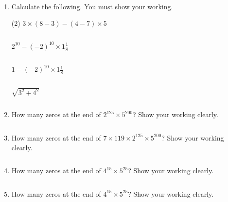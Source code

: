 \begin{enumerate} [leftmargin=0cm]
\item Calculate the following. You must show your working.
\begin{tasks}[label=(\alph*), after-item-skip=2pt,after-skip=3pt, label-width=4ex](2)
    \task  $ 3 \times (8-3) - (4-7) \times 5               $                  \\  \begin{envAnswer}[blankline=5]        $       $ \end{envAnswer}
    \task  $ 2^{10}-(-2)^{10} \times 1 \frac{1}{8}               $                  \\  \begin{envAnswer}[blankline=5]        $       $ \end{envAnswer}
    \task  $ 1-(-2)^{10} \times 1 \frac{1}{8}                  $                  \\  \begin{envAnswer}[blankline=5]        $       $ \end{envAnswer}
    \task  $ \sqrt{3^2 + 4^2}                              $                  \\  \begin{envAnswer}[blankline=5]        $       $ \end{envAnswer}
\end{tasks}


\item   How many zeros at the end of $2^{125} \times 5^{200}$? Show your working clearly.       \begin{envAnswer}[blankline= 2 ] $  $ \end{envAnswer}

\item   How many zeros at the end of $7\times 119 \times 2^{125} \times 5^{200}$? Show your working clearly.        \begin{envAnswer}[blankline= 2 ] $  $ \end{envAnswer}

\item   How many zeros at the end of $4^{15} \times 5^{25}$? Show your working clearly.       \begin{envAnswer}[blankline= 2 ] $  $ \end{envAnswer}

\item   How many zeros at the end of $4^{15} \times 5^{25}$? Show your working clearly.        \begin{envAnswer}[blankline= 2 ] $  $ \end{envAnswer}


\end{enumerate}
